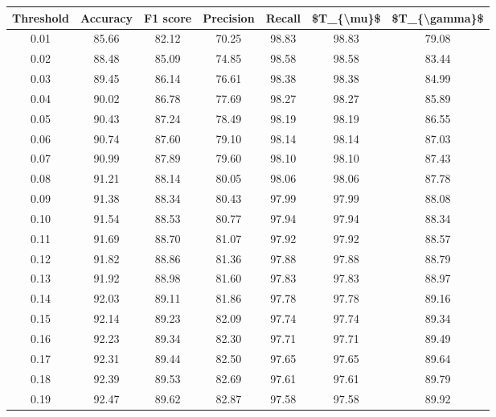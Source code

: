 \begin{tabular}{|c|c|c|c|c|c|c|}
\hline
 Threshold &  Accuracy &  F1 score &  Precision &  Recall &  \$T\_\{\textbackslash mu\}\$ &  \$T\_\{\textbackslash gamma\}\$ \\
\hline
      0.01 &     85.66 &     82.12 &      70.25 &   98.83 &      98.83 &         79.08 \\
      0.02 &     88.48 &     85.09 &      74.85 &   98.58 &      98.58 &         83.44 \\
      0.03 &     89.45 &     86.14 &      76.61 &   98.38 &      98.38 &         84.99 \\
      0.04 &     90.02 &     86.78 &      77.69 &   98.27 &      98.27 &         85.89 \\
      0.05 &     90.43 &     87.24 &      78.49 &   98.19 &      98.19 &         86.55 \\
      0.06 &     90.74 &     87.60 &      79.10 &   98.14 &      98.14 &         87.03 \\
      0.07 &     90.99 &     87.89 &      79.60 &   98.10 &      98.10 &         87.43 \\
      0.08 &     91.21 &     88.14 &      80.05 &   98.06 &      98.06 &         87.78 \\
      0.09 &     91.38 &     88.34 &      80.43 &   97.99 &      97.99 &         88.08 \\
      0.10 &     91.54 &     88.53 &      80.77 &   97.94 &      97.94 &         88.34 \\
      0.11 &     91.69 &     88.70 &      81.07 &   97.92 &      97.92 &         88.57 \\
      0.12 &     91.82 &     88.86 &      81.36 &   97.88 &      97.88 &         88.79 \\
      0.13 &     91.92 &     88.98 &      81.60 &   97.83 &      97.83 &         88.97 \\
      0.14 &     92.03 &     89.11 &      81.86 &   97.78 &      97.78 &         89.16 \\
      0.15 &     92.14 &     89.23 &      82.09 &   97.74 &      97.74 &         89.34 \\
      0.16 &     92.23 &     89.34 &      82.30 &   97.71 &      97.71 &         89.49 \\
      0.17 &     92.31 &     89.44 &      82.50 &   97.65 &      97.65 &         89.64 \\
      0.18 &     92.39 &     89.53 &      82.69 &   97.61 &      97.61 &         89.79 \\
      0.19 &     92.47 &     89.62 &      82.87 &   97.58 &      97.58 &         89.92 \\

\end{tabular}
